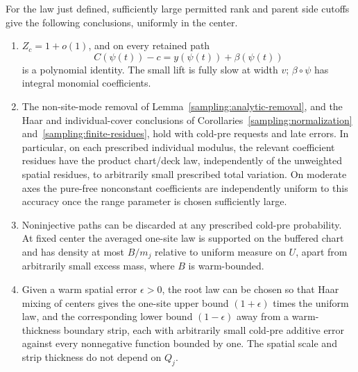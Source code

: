 \begin{lemma}\label{ap:path:ensemble}
For the law just defined, sufficiently large permitted rank and parent
side cutoffs give the following conclusions, uniformly in the center.
\begin{enumerate}
\item $Z_c=1+o(1)$, and on every retained path
\begin{equation}\label{ap:path:exact-lift}
 C(\psi(t))-c=y(\psi(t))+\beta(\psi(t))
\end{equation}
is a polynomial identity.  The small lift is fully slow at width $v$;
$\beta\circ\psi$ has integral monomial coefficients.
\item The non-site-mode removal of
Lemma~\ref{sampling:analytic-removal}, and the Haar and individual-cover
conclusions of Corollaries~\ref{sampling:normalization}
and~\ref{sampling:finite-residues}, hold with cold-pre requests and
late errors.  In particular, on each prescribed individual modulus,
the relevant coefficient residues have the product chart/deck law,
independently of the unweighted spatial residues, to arbitrarily small
prescribed total variation.  On moderate axes the pure-free
nonconstant coefficients are independently uniform to this accuracy
once the range parameter is chosen sufficiently large.
\item Noninjective paths can be discarded at any prescribed cold-pre
probability.  At fixed center the averaged one-site law is supported
on the buffered chart and has density at most $B/m_j$ relative to
uniform measure on $U$, apart from arbitrarily small excess mass,
where $B$ is warm-bounded.
\item Given a warm spatial error $\epsilon>0$, the root law can be
chosen so that Haar mixing of centers gives the one-site upper bound
$(1+\epsilon)$ times the uniform law, and the corresponding lower
bound $(1-\epsilon)$ away from a warm-thickness boundary strip,
each with arbitrarily small cold-pre additive error against every
nonnegative function bounded by one.  The spatial scale and strip
thickness do not depend on $Q_j$.
\end{enumerate}
\end{lemma}

